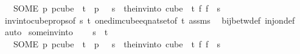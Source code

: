 \begin{isabellebody}
\ \ \ {\isachardoublequoteopen}{\isacharparenleft}{\kern0pt}SOME\ p{\isachardot}{\kern0pt}\ p{\isasymin}cube\ {}\ t\ {\isasymand}\ p\ {}\ {\isacharequal}{\kern0pt}\ s{\isacharparenright}{\kern0pt}\ {\isacharequal}{\kern0pt}\ {\isacharparenleft}{\kern0pt}the{\isacharunderscore}{\kern0pt}inv{\isacharunderscore}{\kern0pt}into\ {\isacharparenleft}{\kern0pt}cube\ {}\ t{\isacharparenright}{\kern0pt}\ {\isacharparenleft}{\kern0pt}{\isasymlambda}f{\isachardot}{\kern0pt}\ f\ {}{\isacharparenright}{\kern0pt}\ s{\isacharparenright}{\kern0pt}{\isachardoublequoteclose}\isanewline
%
\isadelimproof
\ \ %
\endisadelimproof
%
\isatagproof
{}\isamarkupfalse%
\ inv{\isacharunderscore}{\kern0pt}into{\isacharunderscore}{\kern0pt}cube{\isacharunderscore}{\kern0pt}props{\isacharbrackleft}{\kern0pt}of\ s\ t{\isacharbrackright}{\kern0pt}\ one{\isacharunderscore}{\kern0pt}dim{\isacharunderscore}{\kern0pt}cube{\isacharunderscore}{\kern0pt}eq{\isacharunderscore}{\kern0pt}nat{\isacharunderscore}{\kern0pt}set{\isacharbrackleft}{\kern0pt}of\ t{\isacharbrackright}{\kern0pt}\ assms\ \isamarkupfalse%
\ bij{\isacharunderscore}{\kern0pt}betw{\isacharunderscore}{\kern0pt}def\ inj{\isacharunderscore}{\kern0pt}on{\isacharunderscore}{\kern0pt}def\ \isamarkupfalse%
\ auto%
\endisatagproof
{\isafoldproof}%
%
\isadelimproof
\isanewline
%
\endisadelimproof
\isanewline
{}\isamarkupfalse%
\ some{\isacharunderscore}{\kern0pt}inv{\isacharunderscore}{\kern0pt}into{\isacharunderscore}{\kern0pt}{}{\isacharcolon}{\kern0pt}\ \isanewline
\ \ \ {\isachardoublequoteopen}s\ {\isacharless}{\kern0pt}\ t{\isachardoublequoteclose}\ \isanewline
\ \ \ {\isachardoublequoteopen}{\isacharparenleft}{\kern0pt}SOME\ p{\isachardot}{\kern0pt}\ p{\isasymin}cube\ {}\ {\isacharparenleft}{\kern0pt}t{\isacharplus}{\kern0pt}{}{\isacharparenright}{\kern0pt}\ {\isasymand}\ p\ {}\ {\isacharequal}{\kern0pt}\ s{\isacharparenright}{\kern0pt}\ {\isacharequal}{\kern0pt}\ {\isacharparenleft}{\kern0pt}the{\isacharunderscore}{\kern0pt}inv{\isacharunderscore}{\kern0pt}into\ {\isacharparenleft}{\kern0pt}cube\ {}\ t{\isacharparenright}{\kern0pt}\ {\isacharparenleft}{\kern0pt}{\isasymlambda}f{\isachardot}{\kern0pt}\ f\ {}{\isacharparenright}{\kern0pt}\ s{\isacharparenright}{\kern0pt}{\isachardoublequoteclose}\isanewline
%
\isadelimproof
%
\endisadelimproof
%
\isatagproof
{}\isamarkupfalse%

\end{isabellebody}
